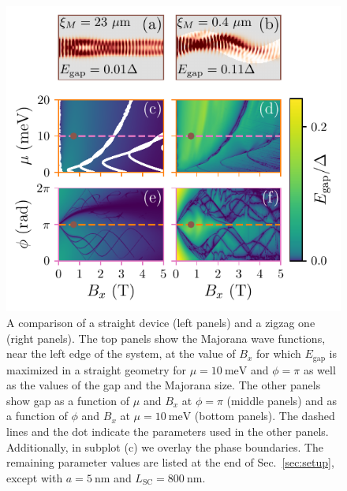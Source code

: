 \begin{figure}
\begin{center}
\includegraphics[width=0.6\columnwidth]{chapter_zigzag/figures/phasediagrams}
\caption{A comparison of a straight device (left panels) and a zigzag one (right panels).
The top panels show the Majorana wave functions, near the left edge of the system, at the value of $B_x$ for which $E_\textrm{gap}$ is maximized in a straight geometry for $\mu=\SI{10}{\meV}$ and $\phi=\pi$ as well as the values of the gap and the Majorana size.
The other panels show gap as a function of $\mu$ and $B_x$ at $\phi=\pi$ (middle panels) and as a function of $\phi$ and $B_x$ at $\mu=\SI{10}{\meV}$ (bottom panels).
The dashed lines and the dot indicate the parameters used in the other panels.
Additionally, in subplot (c) we overlay the phase boundaries.
The remaining parameter values are listed at the end of Sec.~\ref{sec:setup}, except with $a=\SI{5}{\nm}$ and $L_\textrm{SC}=\SI{800}{\nm}$.
\label{fig:phasediagrams}}
\end{center}
\end{figure}

